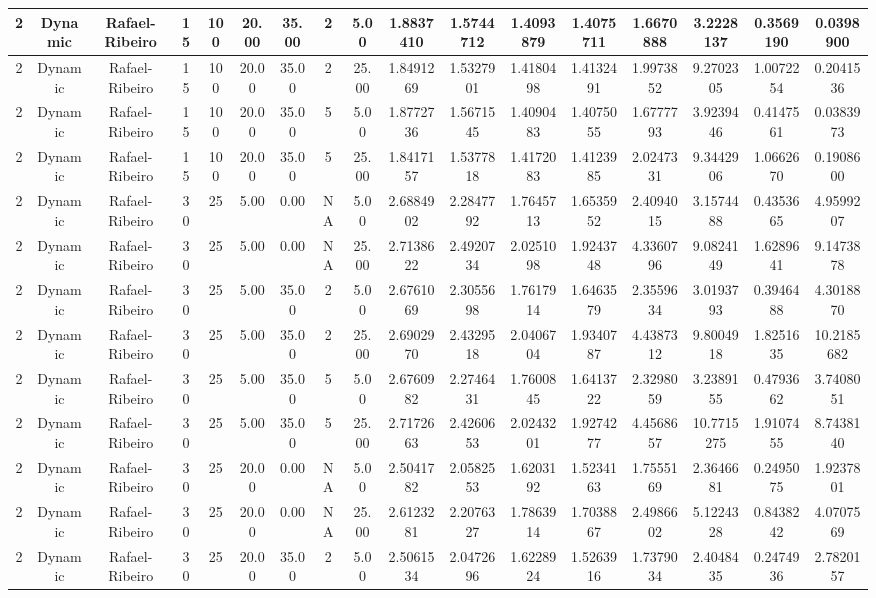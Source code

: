 \begin{longtable}{ | c | c | c | c | c | c | c | c | c | c | c | c | c | c | c | c | c | }
	\hline
	2	&	Dynamic	&	Rafael-Ribeiro	&	15	&	100	&	20.00	&	35.00	&	2	&	5.00	&	1.8837410	&	1.5744712	&	1.4093879	&	1.4075711	&	1.6670888	&	3.2228137	&	0.3569190	&	0.0398900 \\
	\hline
	2	&	Dynamic	&	Rafael-Ribeiro	&	15	&	100	&	20.00	&	35.00	&	2	&	25.00	&	1.8491269	&	1.5327901	&	1.4180498	&	1.4132491	&	1.9973852	&	9.2702305	&	1.0072254	&	0.2041536 \\
	\hline
	2	&	Dynamic	&	Rafael-Ribeiro	&	15	&	100	&	20.00	&	35.00	&	5	&	5.00	&	1.8772736	&	1.5671545	&	1.4090483	&	1.4075055	&	1.6777793	&	3.9239446	&	0.4147561	&	0.0383973 \\
	\hline
	2	&	Dynamic	&	Rafael-Ribeiro	&	15	&	100	&	20.00	&	35.00	&	5	&	25.00	&	1.8417157	&	1.5377818	&	1.4172083	&	1.4123985	&	2.0247331	&	9.3442906	&	1.0662670	&	0.1908600 \\
	\hline
	2	&	Dynamic	&	Rafael-Ribeiro	&	30	&	25	&	5.00	&	0.00	&	NA	&	5.00	&	2.6884902	&	2.2847792	&	1.7645713	&	1.6535952	&	2.4094015	&	3.1574488	&	0.4353665	&	4.9599207 \\
	\hline
	2	&	Dynamic	&	Rafael-Ribeiro	&	30	&	25	&	5.00	&	0.00	&	NA	&	25.00	&	2.7138622	&	2.4920734	&	2.0251098	&	1.9243748	&	4.3360796	&	9.0824149	&	1.6289641	&	9.1473878 \\
	\hline
	2	&	Dynamic	&	Rafael-Ribeiro	&	30	&	25	&	5.00	&	35.00	&	2	&	5.00	&	2.6761069	&	2.3055698	&	1.7617914	&	1.6463579	&	2.3559634	&	3.0193793	&	0.3946488	&	4.3018870 \\
	\hline
	2	&	Dynamic	&	Rafael-Ribeiro	&	30	&	25	&	5.00	&	35.00	&	2	&	25.00	&	2.6902970	&	2.4329518	&	2.0406704	&	1.9340787	&	4.4387312	&	9.8004918	&	1.8251635	&	10.2185682 \\
	\hline
	2	&	Dynamic	&	Rafael-Ribeiro	&	30	&	25	&	5.00	&	35.00	&	5	&	5.00	&	2.6760982	&	2.2746431	&	1.7600845	&	1.6413722	&	2.3298059	&	3.2389155	&	0.4793662	&	3.7408051 \\
	\hline
	2	&	Dynamic	&	Rafael-Ribeiro	&	30	&	25	&	5.00	&	35.00	&	5	&	25.00	&	2.7172663	&	2.4260653	&	2.0243201	&	1.9274277	&	4.4568657	&	10.7715275	&	1.9107455	&	8.7438140 \\
	\hline
	2	&	Dynamic	&	Rafael-Ribeiro	&	30	&	25	&	20.00	&	0.00	&	NA	&	5.00	&	2.5041782	&	2.0582553	&	1.6203192	&	1.5234163	&	1.7555169	&	2.3646681	&	0.2495075	&	1.9237801 \\
	\hline
	2	&	Dynamic	&	Rafael-Ribeiro	&	30	&	25	&	20.00	&	0.00	&	NA	&	25.00	&	2.6123281	&	2.2076327	&	1.7863914	&	1.7038867	&	2.4986602	&	5.1224328	&	0.8438242	&	4.0707569 \\
	\hline
	2	&	Dynamic	&	Rafael-Ribeiro	&	30	&	25	&	20.00	&	35.00	&	2	&	5.00	&	2.5061534	&	2.0472696	&	1.6228924	&	1.5263916	&	1.7379034	&	2.4048435	&	0.2474936	&	2.7820157 \\

\end{longtable}

